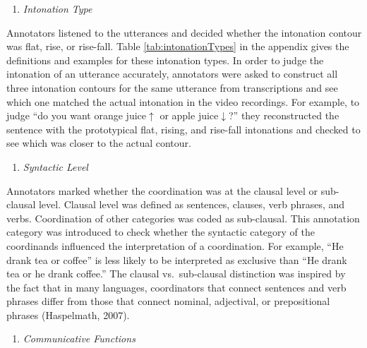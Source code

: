 \documentclass[
  english,
  ,man,floatsintext]{apa6}
\providecommand{\tightlist}{%
  \setlength{\itemsep}{0pt}\setlength{\parskip}{0pt}}
\begin{document}
\begin{enumerate}
\def\labelenumi{\arabic{enumi}.}
\setcounter{enumi}{3}
\tightlist
\item
  \emph{Intonation Type}
\end{enumerate}

Annotators listened to the utterances and decided whether the intonation contour was flat, rise, or rise-fall. Table \ref{tab:intonationTypes} in the appendix gives the definitions and examples for these intonation types. In order to judge the intonation of an utterance accurately, annotators were asked to construct all three intonation contours for the same utterance from transcriptions and see which one matched the actual intonation in the video recordings. For example, to judge ``do you want orange juice\(\uparrow\) or apple juice\(\downarrow\)?'' they reconstructed the sentence with the prototypical flat, rising, and rise-fall intonations and checked to see which was closer to the actual contour.

\begin{enumerate}
\def\labelenumi{\arabic{enumi}.}
\setcounter{enumi}{4}
\tightlist
\item
  \emph{Syntactic Level}
\end{enumerate}

Annotators marked whether the coordination was at the clausal level or sub-clausal level. Clausal level was defined as sentences, clauses, verb phrases, and verbs. Coordination of other categories was coded as sub-clausal. This annotation category was introduced to check whether the syntactic category of the coordinands influenced the interpretation of a coordination. For example, ``He drank tea or coffee'' is less likely to be interpreted as exclusive than ``He drank tea or he drank coffee.'' The clausal vs.~sub-clausal distinction was inspired by the fact that in many languages, coordinators that connect sentences and verb phrases differ from those that connect nominal, adjectival, or prepositional phrases (Haspelmath, 2007).

\begin{enumerate}
\def\labelenumi{\arabic{enumi}.}
\setcounter{enumi}{5}
\tightlist
\item
  \emph{Communicative Functions}
\end{enumerate}
\end{document}
